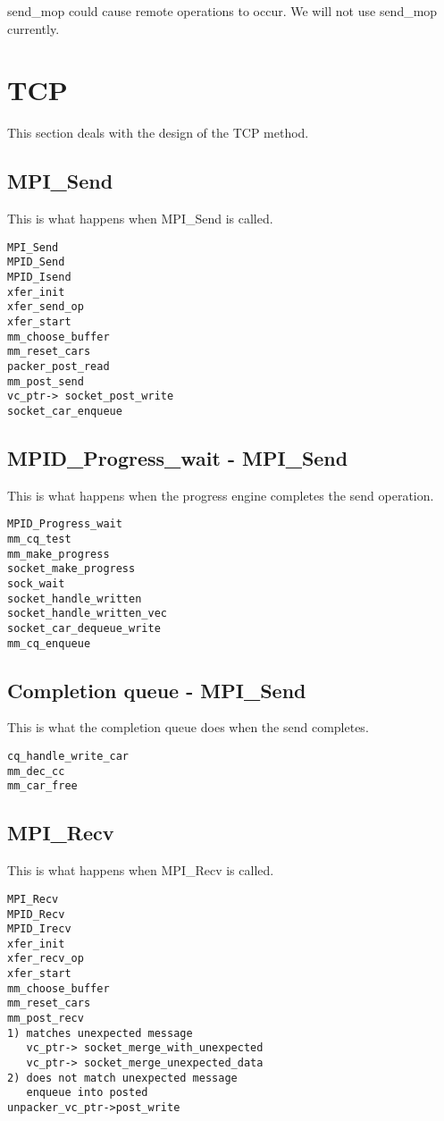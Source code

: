 \documentclass[dvipdfm,twoside,11pt]{article}
\begin{document}
send\_mop could cause remote operations to occur.  We will not use send\_mop 
currently.

\section{TCP}
This section deals with the design of the TCP method.

\subsection{MPI\_Send}
This is what happens when MPI\_Send is called.
\begin{verbatim}
MPI_Send
MPID_Send
MPID_Isend
xfer_init
xfer_send_op
xfer_start
mm_choose_buffer
mm_reset_cars
packer_post_read
mm_post_send
vc_ptr-> socket_post_write
socket_car_enqueue
\end{verbatim}

\subsection{MPID\_Progress\_wait - MPI\_Send}
This is what happens when the progress engine completes the send operation.
\begin{verbatim}
MPID_Progress_wait
mm_cq_test
mm_make_progress
socket_make_progress
sock_wait
socket_handle_written
socket_handle_written_vec
socket_car_dequeue_write
mm_cq_enqueue
\end{verbatim}

\subsection{Completion queue - MPI\_Send}
This is what the completion queue does when the send completes.
\begin{verbatim}
cq_handle_write_car
mm_dec_cc
mm_car_free
\end{verbatim}

\subsection{MPI\_Recv}
This is what happens when MPI\_Recv is called.
\begin{verbatim}
MPI_Recv
MPID_Recv
MPID_Irecv
xfer_init
xfer_recv_op
xfer_start
mm_choose_buffer
mm_reset_cars
mm_post_recv
1) matches unexpected message
   vc_ptr-> socket_merge_with_unexpected
   vc_ptr-> socket_merge_unexpected_data
2) does not match unexpected message
   enqueue into posted
unpacker_vc_ptr->post_write
\end{verbatim}
\end{document}
